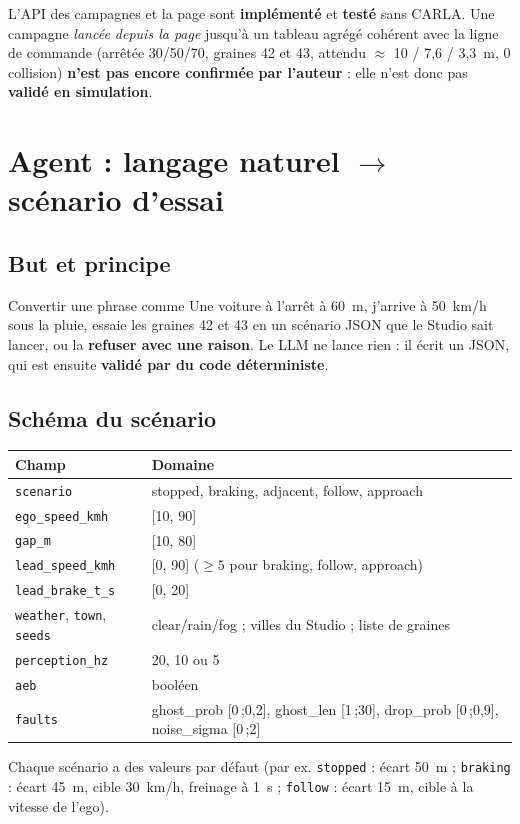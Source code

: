 \documentclass[11pt,a4paper]{article}
\providecommand{\og}{\guillemotleft\nobreakspace}
\providecommand{\fg}{\nobreakspace\guillemotright}
\newcommand{\impl}{\textcolor{warnc}{\textbf{impl\'ement\'e}}}
\newcommand{\teste}{\textcolor{accent}{\textbf{test\'e}}}
\newcommand{\valide}{\textcolor{okc}{\textbf{valid\'e en simulation}}}
\newcommand{\code}[1]{\texttt{#1}}
\begin{document}
\begin{limite}
L'API des campagnes et la page sont \impl{} et \teste{} sans CARLA. Une campagne \emph{lanc\'ee depuis la page} jusqu'\`a un tableau agr\'eg\'e coh\'erent avec la ligne de commande
(arr\^et\'ee 30/50/70, graines 42 et 43, attendu $\approx$ 10 / 7,6 / 3,3~m, 0 collision) \textbf{n'est pas encore confirm\'ee par l'auteur} : elle n'est donc pas \valide.
\end{limite}

\section{Agent : langage naturel $\rightarrow$ sc\'enario d'essai}
\subsection{But et principe}
Convertir une phrase comme \og Une voiture \`a l'arr\^et \`a 60~m, j'arrive \`a 50~km/h sous la pluie, essaie les graines 42 et 43 \fg{} en un sc\'enario JSON que le Studio sait lancer, ou la \textbf{refuser avec une raison}.
Le LLM ne lance rien : il \'ecrit un JSON, qui est ensuite \textbf{valid\'e par du code d\'eterministe}.

\subsection{Sch\'ema du sc\'enario}
\begin{center}\small\begin{tabular}{@{}ll@{}}\toprule
Champ & Domaine \\\midrule
\code{scenario} & stopped, braking, adjacent, follow, approach \\
\code{ego\_speed\_kmh} & [10, 90] \\
\code{gap\_m} & [10, 80] \\
\code{lead\_speed\_kmh} & [0, 90] ($\ge5$ pour braking, follow, approach) \\
\code{lead\_brake\_t\_s} & [0, 20] \\
\code{weather}, \code{town}, \code{seeds} & clear/rain/fog ; villes du Studio ; liste de graines \\
\code{perception\_hz} & 20, 10 ou 5 \\
\code{aeb} & bool\'een \\
\code{faults} & ghost\_prob [0\,;0,2], ghost\_len [1\,;30], drop\_prob [0\,;0,9], noise\_sigma [0\,;2] \\
\bottomrule\end{tabular}\end{center}
Chaque sc\'enario a des valeurs par d\'efaut (par ex. \code{stopped} : \'ecart 50~m ; \code{braking} : \'ecart 45~m, cible 30~km/h, freinage \`a 1~s ; \code{follow} : \'ecart 15~m, cible \`a la vitesse de l'ego).
\end{document}
